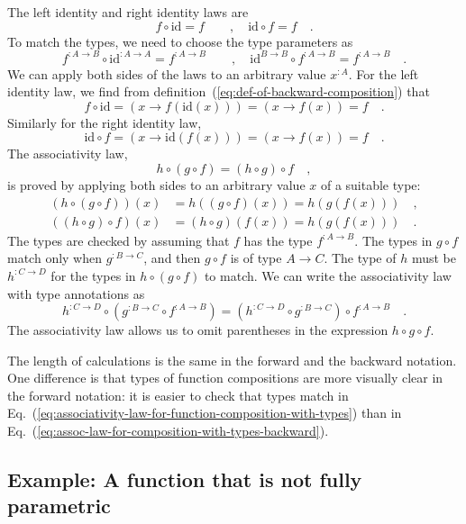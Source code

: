 The left identity and right identity laws are
\[
f\circ\text{id}=f\quad\quad,\quad\text{id}\circ f=f\quad.
\]
To match the types, we need to choose the type parameters as
\[
f^{:A\rightarrow B}\circ\text{id}^{:A\rightarrow A}=f^{:A\rightarrow B}\quad\quad,\quad\text{id}^{B\rightarrow B}\circ f^{:A\rightarrow B}=f^{:A\rightarrow B}\quad.
\]
We can apply both sides of the laws to an arbitrary value $x^{:A}$.
For the left identity law, we find from definition~(\ref{eq:def-of-backward-composition})
that
\[
f\circ\text{id}=\left(x\rightarrow f(\text{id}(x))\right)=\left(x\rightarrow f(x)\right)=f\quad.
\]
Similarly for the right identity law,
\[
\text{id}\circ f=\left(x\rightarrow\text{id}(f(x))\right)=\left(x\rightarrow f\left(x\right)\right)=f\quad.
\]
The associativity law,
\[
h\circ\left(g\circ f\right)=\left(h\circ g\right)\circ f\quad,
\]
is proved by applying both sides to an arbitrary value $x$ of a suitable
type:
\begin{align*}
\left(h\circ\left(g\circ f\right)\right)(x) & =h\left(\left(g\circ f\right)(x)\right)=h\left(g\left(f\left(x\right)\right)\right)\quad,\\
\left(\left(h\circ g\right)\circ f\right)(x) & =\left(h\circ g\right)\left(f(x)\right)=h\left(g\left(f\left(x\right)\right)\right)\quad.
\end{align*}
The types are checked by assuming that $f$ has the type $f^{:A\rightarrow B}$.
The types in $g\circ f$ match only when $g^{:B\rightarrow C}$, and
then $g\circ f$ is of type $A\rightarrow C$. The type of $h$ must
be $h^{:C\rightarrow D}$ for the types in $h\circ\left(g\circ f\right)$
to match. We can write the associativity law with type annotations
as
\begin{equation}
h^{:C\rightarrow D}\circ(g^{:B\rightarrow C}\circ f^{:A\rightarrow B})=(h^{:C\rightarrow D}\circ g^{:B\rightarrow C})\circ f^{:A\rightarrow B}\quad.\label{eq:assoc-law-for-composition-with-types-backward}
\end{equation}
The associativity law allows us to omit parentheses in the expression
$h\circ g\circ f$. 

The length of calculations is the same in the forward and the backward
notation. One difference is that types of function compositions are
more visually clear in the forward notation: it is easier to check
that types match in Eq.~(\ref{eq:associativity-law-for-function-composition-with-types})
than in Eq.~(\ref{eq:assoc-law-for-composition-with-types-backward}).

\subsection{Example: A function that is not fully parametric}

